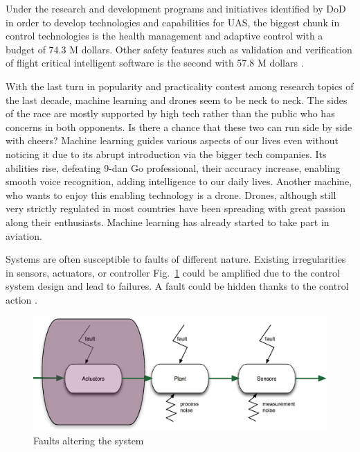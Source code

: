 Under the research and development programs and initiatives identified by DoD in order to develop technologies and capabilities for UAS, the biggest chunk in control technologies is the health management and adaptive control with a budget of 74.3 M dollars. 
Other safety features such as validation and verification of flight critical intelligent software is the second with 57.8 M dollars \cite{UnmannedSystemsRoadmapDoD}. 

With the last turn in popularity and practicality contest among research topics of the last decade, machine learning and drones seem to be neck to neck. The sides of the race are mostly supported by high tech rather than the public who has concerns in both opponents. Is there a chance that these two can run side by side with cheers? Machine learning guides various aspects of our lives even without noticing it due to its abrupt introduction via the bigger tech companies. Its abilities rise, defeating 9-dan Go professional, their accuracy increase, enabling smooth voice recognition, adding intelligence to our daily lives. Another machine, who wants to enjoy this enabling technology is a drone. Drones, although still very strictly regulated in most countries have been spreading with great passion along their enthusiasts. Machine learning has already started to take part in aviation.

Systems are often susceptible to faults of different nature. Existing irregularities in 
sensors, actuators, or controller Fig.~\ref{fig:faultsInTheSystem} could be amplified due to the control system design 
and lead to failures. A fault could be hidden thanks to the control action \cite{ducard2009fault}.

\begin{figure}
\begin{center}
\includegraphics[width=15cm]{figures/faultsInTheSystem}    %
\caption{Faults altering the system } 
\label{fig:faultsInTheSystem}
\end{center}
\end{figure}




